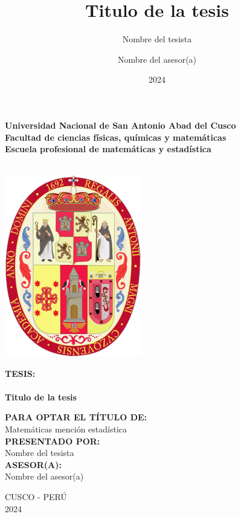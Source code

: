 \documentclass[
  12pt,
  letterpaper,
]{scrreprt}
\title{Titulo de la tesis}
\author{Nombre del tesista \and Nombre del asesor(a)}
\date{2024}
\begin{document}
\thispagestyle{empty}
\hspace{0.075\textwidth} 
\begin{minipage}[b][\textheight][s]{0.85\textwidth}

\centering
\textbf{\large{Universidad Nacional de San Antonio Abad del Cusco}} \\
\textbf{\large{Facultad de ciencias físicas, químicas y matemáticas}} \\
\textbf{\large{Escuela profesional de matemáticas y estadística}} \\
\textbf{\large{}} \\ %
\vspace{1\baselineskip}

\includegraphics[width=6cm]{imagen/unsaac.png}
\vspace{1\baselineskip}

\Large{\textbf{TESIS:}} \\
\hrulefill \\
{\Large\bfseries{Titulo de la tesis}} \\
\hrulefill 



\large{
\flushleft \hspace{6cm}
\textbf{PARA OPTAR EL TÍTULO DE:} \\
\hspace{6cm} Matemáticas mención estadística \\ 
\smallskip
\hspace{6cm} \textbf{PRESENTADO POR:} \\ \hspace{6cm}
 {\large{Nombre del tesista}}
\\
\smallskip
\hspace{6cm} \textbf{ASESOR(A):} \\ \hspace{6cm}
%
{\large{Nombre del asesor(a)}}%

}

\vfill

\centering
\Large{CUSCO - PERÚ} \\
\Large{2024}
\vspace{0.1\textheight} 
\end{minipage}
\end{document}
